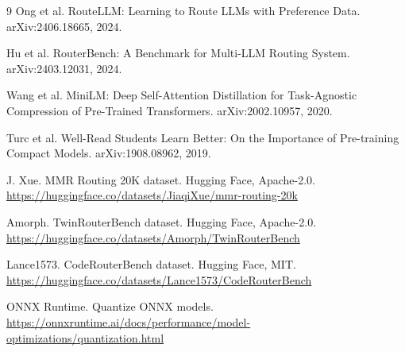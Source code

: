 \documentclass[10pt,twocolumn]{article}
\begin{document}
\begin{thebibliography}{9}
Ong et al. RouteLLM: Learning to Route LLMs with Preference Data. arXiv:2406.18665, 2024.

Hu et al. RouterBench: A Benchmark for Multi-LLM Routing System. arXiv:2403.12031, 2024.

Wang et al. MiniLM: Deep Self-Attention Distillation for Task-Agnostic Compression of Pre-Trained Transformers. arXiv:2002.10957, 2020.

Turc et al. Well-Read Students Learn Better: On the Importance of Pre-training Compact Models. arXiv:1908.08962, 2019.

J. Xue. MMR Routing 20K dataset. Hugging Face, Apache-2.0. \url{https://huggingface.co/datasets/JiaqiXue/mmr-routing-20k}

Amorph. TwinRouterBench dataset. Hugging Face, Apache-2.0. \url{https://huggingface.co/datasets/Amorph/TwinRouterBench}

Lance1573. CodeRouterBench dataset. Hugging Face, MIT. \url{https://huggingface.co/datasets/Lance1573/CodeRouterBench}

ONNX Runtime. Quantize ONNX models. \url{https://onnxruntime.ai/docs/performance/model-optimizations/quantization.html}
\end{thebibliography}
\end{document}
